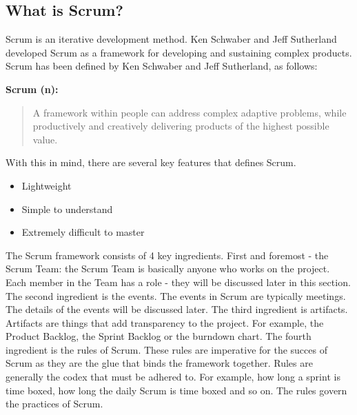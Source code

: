 \subsection{What is Scrum?}

Scrum is an iterative development method\cite{scrumguide11}.
Ken Schwaber and Jeff Sutherland developed Scrum as a framework for developing 
and sustaining complex products\cite{scrumguide11}. Scrum has been defined by 
Ken Schwaber and Jeff Sutherland, as follows:

\textbf{Scrum (n):} \begin{quotation}
A framework within people can address complex adaptive 
problems, while productively and creatively delivering products of the highest 
possible value\cite{scrumguide11}.
\end{quotation}

With this in mind, there are several key features that defines Scrum.

\begin{itemize}
	\item Lightweight
	\item Simple to understand
	\item Extremely difficult to master\cite{scrumguide11}
\end{itemize}

The Scrum framework consists of 4 key ingredients\cite{scrumguide11}. First and
foremost - the Scrum Team: the Scrum Team is basically anyone who works on the project. Each member in the Team has a 
role - they will be discussed later in this section.
The second ingredient is the events. The events in Scrum are typically meetings. The 
details of the events will be discussed later. The third ingredient is artifacts. Artifacts 
are things that add transparency to the project. For example, the Product Backlog, the 
Sprint Backlog or the burndown chart\cite{scrumguide11}. The fourth ingredient is the rules 
of Scrum. These rules are imperative for the succes of Scrum as they are the glue that binds 
the framework together. Rules are generally the codex that must be adhered to. For example, 
how long a sprint is time boxed, how long the daily Scrum is time boxed and so on. The rules 
govern the practices of Scrum\cite{scrumguide11}.



